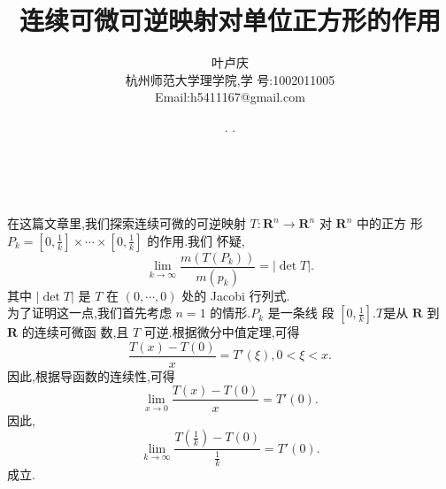 \documentclass[a4paper, 12pt]{article} %
\makeatletter
\renewcommand{\maketitle}{ %
  \renewcommand\refname{参考文献}
  \newcommand{\D}{\displaystyle}\newcommand{\ri}{\Rightarrow}
  \newcommand{\ds}{\displaystyle} \renewcommand{\ni}{\noindent}
  \newcommand{\pa}{\partial} \newcommand{\Om}{\Omega}
  \newcommand{\om}{\omega} \newcommand{\sik}{\sum_{i=1}^k}
  \newcommand{\vov}{\Vert\omega\Vert} \newcommand{\Umy}{U_{\mu_i,y^i}}
  \newcommand{\lamns}{\lambda_n^{^{\scriptstyle\sigma}}}
  \newcommand{\chiomn}{\chi_{_{\Omega_n}}}
  \newcommand{\ullim}{\underline{\lim}} \newcommand{\bsy}{\boldsymbol}
  \newcommand{\mvb}{\mathversion{bold}} \newcommand{\la}{\lambda}
  \newcommand{\La}{\Lambda} \newcommand{\va}{\varepsilon}
  \newcommand{\be}{\beta} \newcommand{\al}{\alpha}
  \newcommand{\dis}{\displaystyle} \newcommand{\R}{{\mathbb R}}
  \newcommand{\N}{{\mathbb N}} \newcommand{\cF}{{\mathcal F}}
  \newcommand{\gB}{{\mathfrak B}} \newcommand{\eps}{\epsilon}
  \begin{flushright} %
    {\LARGE\@title} %
    
    \vspace{50pt} %
    
    {\large\@author} %
    \\\@date %
    
    \vspace{40pt} %
  \end{flushright}
}
\makeatother
\begin{document}
\title{\textbf{连续可微可逆映射对单位正方形的作用}}
\author{\small{叶卢庆}\\{\small{杭州师范大学理学院,学
      号:1002011005}}\\{\small{Email:h5411167@gmail.com}}} %
\renewcommand{\today}{\number\year. \number\month. \number\day}
\date{\today} %
  
  
  
\maketitle %
  
  
  
  
  
  
  
在这篇文章里,我们探索连续可微的可逆映射 $T:\mathbf{R}^n\to
\mathbf{R}^n$ 对 $\mathbf{R}^n$ 中的正方
形$P_{k}=[0,\frac{1}{k}]\times\cdots\times [0,\frac{1}{k}]$ 的作用.我们
怀疑,
$$
\lim_{k\to \infty}\frac{m(T(P_k))}{m(p_k)}=|\det T|.
$$
其中 $|\det T|$ 是 $T$ 在 $(0,\cdots,0)$ 处的 Jacobi 行列式.\\

为了证明这一点,我们首先考虑 $n=1$ 的情形.$P_k$ 是一条线
段 $[0,\frac{1}{k}]$.$T$是从 $\mathbf{R}$ 到 $\mathbf{R}$ 的连续可微函
数,且 $T$ 可逆.根据微分中值定理,可得
$$
\frac{T(x)-T(0)}{x}=T'(\xi),0<\xi<x.
$$
因此,根据导函数的连续性,可得
$$
\lim_{x\to 0} \frac{T(x)-T(0)}{x}=T'(0).
$$
因此,
$$
\lim_{k\to\infty}\frac{T(\frac{1}{k})-T(0)}{\frac{1}{k}}=T'(0).
$$
成立.\\
\end{document}
